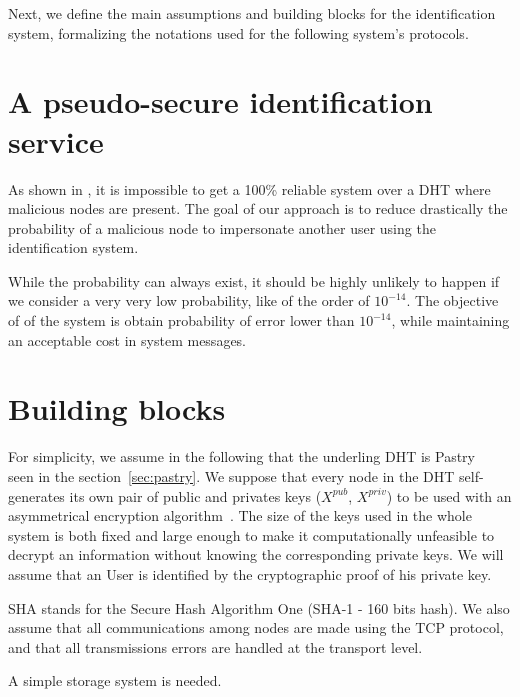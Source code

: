 Next, we define the main assumptions and building blocks for the
identification system, formalizing the notations used for the following system's protocols.


\section{A pseudo-secure identification service}
\label{sec:pseudo-secure}
As shown in \cite{the_sybil_attack}, it is impossible to get a 100\% reliable
system over a DHT where malicious nodes are present. The goal of our approach
is to reduce drastically the probability of a malicious node to impersonate
another user using the identification system.

While the probability can always exist, it should be highly unlikely to happen
if we consider a very very low probability, like of the order of $10^{-14}$. The objective of of
the system is obtain probability of error lower than $10^{-14}$, while
maintaining an acceptable cost in system messages.

\section{Building blocks}
\label{sec:building_blocks}

For simplicity, we assume in the following that the underling DHT is
Pastry~\cite{pastry} seen in the section~\ref{sec:pastry}. We suppose that
every node in the DHT self-generates its own pair of public and privates keys
($X^{pub}$, $X^{priv}$) to be used with an asymmetrical encryption
algorithm~\cite{asymmetrical_encryption_algorithm}. The size of the keys used
in the whole system is both fixed and large enough to make it computationally
unfeasible to decrypt an information without knowing the corresponding private
keys. We will assume that an User is identified by the cryptographic proof of
his private key. 

SHA stands for the Secure Hash Algorithm One (SHA-1 - 160 bits hash). We also
assume that all communications among nodes are made using the TCP protocol, and
that all transmissions errors are handled at the transport level.

A simple storage system is needed.


